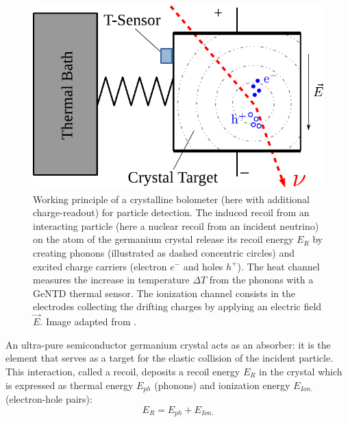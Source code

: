 \begin{figure}
\centering
\includegraphics[scale=1]{Figures/Experiment/crystalline_detector_principle.pdf}
\caption{Working principle of a crystalline bolometer (here with additional charge-readout) for particle detection. The induced recoil from an interacting particle (here a nuclear recoil from an incident neutrino) on the atom of the germanium crystal release its recoil energy $E_R$ by creating phonons (illustrated as dashed concentric circles) and excited charge carriers (electron $e^-$ and holes $h^+$). The heat channel measures the increase in temperature $\Delta T$ from the phonons with a GeNTD thermal sensor. The ionization channel consists in the electrodes collecting the drifting charges by applying an electric field $\vec{E}$. Image adapted from \cite{Schumann:2019eaa}.}
\label{fig:detector-principle}
\end{figure}

An ultra-pure semiconductor germanium crystal acts as an absorber: it is the element that serves as a target for the elastic collision of the incident particle. This interaction, called a recoil, deposits a recoil energy $E_R$ in the crystal which is expressed as thermal energy $E_{ph}$ (phonons) and ionization energy $E_{Ion.}$ (electron-hole pairs):
\begin{equation}
\label{energy}
E_R = E_{ph} + E_{Ion.}
\end{equation}

